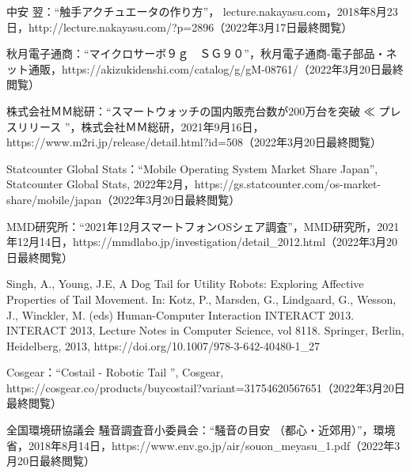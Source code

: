 \documentclass[a4paper]{jsarticle}
\begin{document}
\begin{thebibliography}{999}
中安 翌：“触手アクチュエータの作り方”， lecture.nakayasu.com，2018年8月23日，http://lecture.nakayasu.com/?p=2896（2022年3月17日最終閲覧）

秋月電子通商：“マイクロサーボ９ｇ　ＳＧ９０”，秋月電子通商-電子部品・ネット通販，https://akizukidenshi.com/catalog/g/gM-08761/（2022年3月20日最終閲覧）

\begin{flushleft}
株式会社ＭＭ総研：“スマートウォッチの国内販売台数が200万台を突破 ≪ プレスリリース ”，株式会社ＭＭ総研，2021年9月16日，https://www.m2ri.jp/release/detail.html?id=508（2022年3月20日最終閲覧）
\end{flushleft}

Statcounter Global Stats：“Mobile Operating System Market Share Japan”, Statcounter Global Stats, 2022年2月，https://gs.statcounter.com/os-market-share/mobile/japan（2022年3月20日最終閲覧）

MMD研究所：“2021年12月スマートフォンOSシェア調査”，MMD研究所，2021年12月14日，https://mmdlabo.jp/investigation/detail\_2012.html（2022年3月20日最終閲覧）

Singh, A., Young, J.E, A Dog Tail for Utility Robots: Exploring Affective Properties of Tail Movement. In: Kotz, P., Marsden, G., Lindgaard, G., Wesson, J., Winckler, M. (eds) Human-Computer Interaction  INTERACT 2013. INTERACT 2013, Lecture Notes in Computer Science, vol 8118. Springer, Berlin, Heidelberg, 2013, https://doi.org/10.1007/978-3-642-40480-1\_27

\begin{flushleft}
Cosgear：“Costail - Robotic Tail ”, Cosgear, https://cosgear.co/products/buycostail?variant=31754620567651（2022年3月20日最終閲覧）
\end{flushleft}

全国環境研協議会 騒音調査音小委員会：“騒音の目安 （都心・近郊用）”，環境省，2018年8月14日，https://www.env.go.jp/air/souon\_meyasu\_1.pdf（2022年3月20日最終閲覧）


\end{thebibliography}
\end{document}
